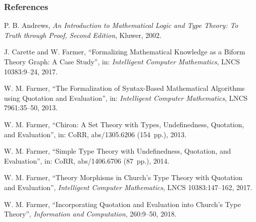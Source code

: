 \documentclass[t,12pt,numbers,fleqn]{beamer}
\begin{document}
\begin{frame}\label{lastframe}
\frametitle{References}
\bi

\footnotesize


  \item \bbrown{[And02]} P. B. Andrews, \emph{An Introduction to
    Mathematical Logic and Type Theory: To Truth through Proof, Second
    Edition}, Kluwer, 2002.

  \item \bbrown{[CarFar17]} J. Carette and W. Farmer, ``Formalizing
    Mathematical Knowledge as a Biform Theory Graph: A Case Study'',
    in: \emph{Intelligent Computer Mathematics}, LNCS 10383:9--24,
    2017.

  \item \bbrown{[Far13]} W. M. Farmer, ``The Formalization of
    Syntax-Based Mathematical Algorithms using Quotation and
    Evaluation'', in: \emph{Intelligent Computer Mathematics}, LNCS
    7961:35--50, 2013.

  \item \bbrown{[Far13a]} W. M. Farmer, ``Chiron: A Set Theory with
    Types, Undefinedness, Quotation, and Evaluation'', in: CoRR,
    abs/1305.6206 (154~pp.), 2013.

  \item \bbrown{[Far14]} W. M. Farmer, ``Simple Type Theory with Undefinedness,
    Quotation, and Evaluation'', in: CoRR,
    abs/1406.6706 (87~pp.), 2014.

  \item \bbrown{[Far17]} W. M. Farmer, ``Theory Morphisms in Church's
    Type Theory with Quotation and Evaluation'', \emph{Intelligent
      Computer Mathematics}, LNCS 10383:147--162, 2017.

  \item \bbrown{[Far18]} W. M. Farmer, ``Incorporating Quotation and
    Evaluation into Church's Type Theory'', \emph{Information and
      Computation}, 260:9--50, 2018.

\ei
\end{frame}

\iffalse


\begin{frame}
\frametitle{}
\bi

  \item 

\ei
\end{frame}

\fi
\end{document}
